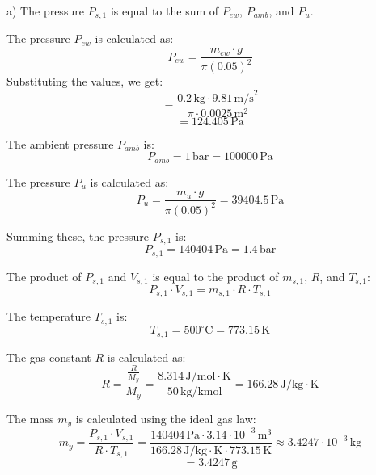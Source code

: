 a) The pressure \( P_{s,1} \) is equal to the sum of \( P_{ew} \), \( P_{amb} \), and \( P_u \).

The pressure \( P_{ew} \) is calculated as:
\[
P_{ew} = \frac{m_{ew} \cdot g}{\pi (0.05)^2}
\]
Substituting the values, we get:
\[
= \frac{0.2 \, \text{kg} \cdot 9.81 \, \text{m/s}^2}{\pi \cdot 0.0025 \, \text{m}^2}
\]
\[
= 124.405 \, \text{Pa}
\]

The ambient pressure \( P_{amb} \) is:
\[
P_{amb} = 1 \, \text{bar} = 100000 \, \text{Pa}
\]

The pressure \( P_u \) is calculated as:
\[
P_u = \frac{m_u \cdot g}{\pi (0.05)^2} = 39404.5 \, \text{Pa}
\]

Summing these, the pressure \( P_{s,1} \) is:
\[
P_{s,1} = 140404 \, \text{Pa} = 1.4 \, \text{bar}
\]

The product of \( P_{s,1} \) and \( V_{s,1} \) is equal to the product of \( m_{s,1} \), \( R \), and \( T_{s,1} \):
\[
P_{s,1} \cdot V_{s,1} = m_{s,1} \cdot R \cdot T_{s,1}
\]

The temperature \( T_{s,1} \) is:
\[
T_{s,1} = 500^\circ \text{C} = 773.15 \, \text{K}
\]

The gas constant \( R \) is calculated as:
\[
R = \frac{\frac{R}{M_y}}{M_y} = \frac{8.314 \, \text{J/mol} \cdot \text{K}}{50 \, \text{kg/kmol}} = 166.28 \, \text{J/kg} \cdot \text{K}
\]

The mass \( m_y \) is calculated using the ideal gas law:
\[
m_y = \frac{P_{s,1} \cdot V_{s,1}}{R \cdot T_{s,1}} = \frac{140404 \, \text{Pa} \cdot 3.14 \cdot 10^{-3} \, \text{m}^3}{166.28 \, \text{J/kg} \cdot \text{K} \cdot 773.15 \, \text{K}} \approx 3.4247 \cdot 10^{-3} \, \text{kg}
\]
\[
= 3.4247 \, \text{g}
\]